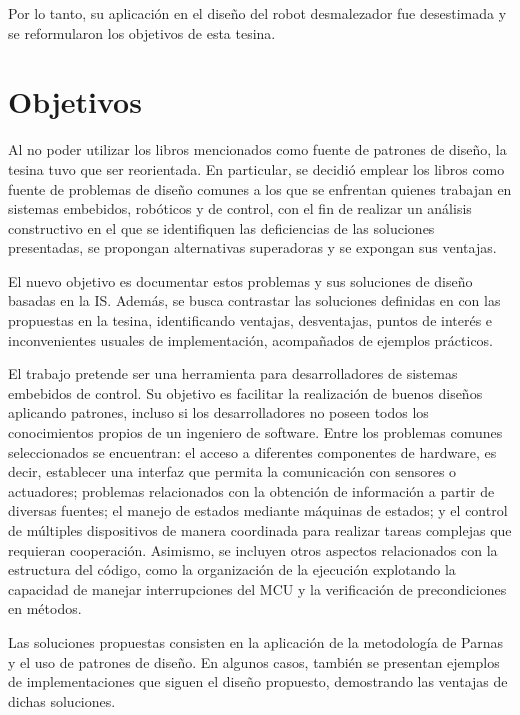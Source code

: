 Por lo tanto, su aplicación en el diseño del robot desmalezador fue desestimada y se reformularon los objetivos de esta tesina.

\section*{Objetivos}

Al no poder utilizar los libros mencionados como fuente de patrones de diseño, la tesina tuvo que ser reorientada. En particular, se decidió emplear los libros como fuente de problemas de diseño comunes a los que se enfrentan quienes trabajan en sistemas embebidos, robóticos y de control, con el fin de realizar un análisis constructivo en el que se identifiquen las deficiencias de las soluciones presentadas, se propongan alternativas superadoras y se expongan sus ventajas.

El nuevo objetivo es documentar estos problemas y sus soluciones de diseño basadas en la \gls{IS}. Además, se busca contrastar las soluciones definidas en \cite{douglass} con las propuestas en la tesina, identificando ventajas, desventajas, puntos de interés e inconvenientes usuales de implementación, acompañados de ejemplos prácticos.

El trabajo pretende ser una herramienta para desarrolladores de sistemas embebidos de control. Su objetivo es facilitar la realización de buenos diseños aplicando patrones, incluso si los desarrolladores no poseen todos los conocimientos propios de un ingeniero de software. Entre los problemas comunes seleccionados se encuentran: el acceso a diferentes componentes de hardware, es decir, establecer una interfaz que permita la comunicación con sensores o actuadores; problemas relacionados con la obtención de información a partir de diversas fuentes; el manejo de estados mediante máquinas de estados; y el control de múltiples dispositivos de manera coordinada para realizar tareas complejas que requieran cooperación. Asimismo, se incluyen otros aspectos relacionados con la estructura del código, como la organización de la ejecución explotando la capacidad de manejar interrupciones del \gls{MCU} y la verificación de precondiciones en métodos.

Las soluciones propuestas consisten en la aplicación de la metodología de Parnas \cite{Parnas1972} y el uso de patrones de diseño. En algunos casos, también se presentan ejemplos de implementaciones que siguen el diseño propuesto, demostrando las ventajas de dichas soluciones.

